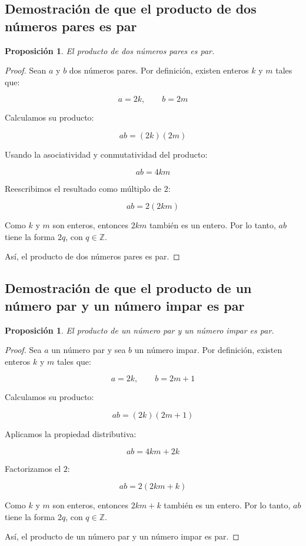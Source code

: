 \documentclass[12pt,final]{report}
\theoremstyle{plain}
\newtheorem{proposition}[theorem]{Proposición}
\theoremstyle{definition}
\begin{document}
\newpage


\subsection{Demostración de que el producto de dos números pares es par}

\begin{proposition}
El producto de dos números pares es par.
\end{proposition}

\begin{proof}

Sean $a$ y $b$ dos números pares. Por definición, existen enteros $k$ y $m$ tales que:

\[
a = 2k, \qquad b = 2m
\]

Calculamos su producto:

\[
ab = (2k)(2m)
\]

Usando la asociatividad y conmutatividad del producto:

\[
ab = 4km
\]

Reescribimos el resultado como múltiplo de $2$:

\[
ab = 2(2km)
\]

Como $k$ y $m$ son enteros, entonces $2km$ también es un entero. Por lo tanto, $ab$ tiene la forma $2q$, con $q \in \mathbb{Z}$.

Así, el producto de dos números pares es par.

\end{proof}

\newpage

\subsection{Demostración de que el producto de un número par y un número impar es par}

\begin{proposition}
El producto de un número par y un número impar es par.
\end{proposition}

\begin{proof}

Sea $a$ un número par y sea $b$ un número impar. Por definición, existen enteros $k$ y $m$ tales que:

\[
a = 2k, \qquad b = 2m+1
\]

Calculamos su producto:

\[
ab = (2k)(2m+1)
\]

Aplicamos la propiedad distributiva:

\[
ab = 4km + 2k
\]

Factorizamos el $2$:

\[
ab = 2(2km+k)
\]

Como $k$ y $m$ son enteros, entonces $2km+k$ también es un entero. Por lo tanto, $ab$ tiene la forma $2q$, con $q \in \mathbb{Z}$.

Así, el producto de un número par y un número impar es par.

\end{proof}
\end{document}
